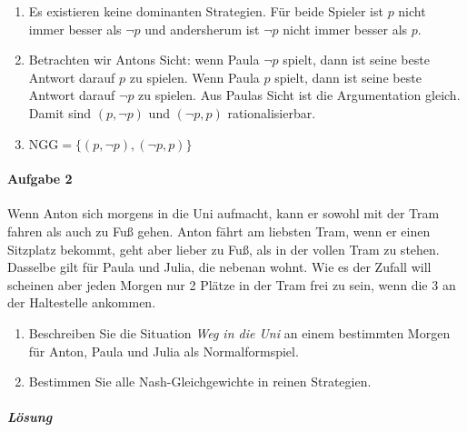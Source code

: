\begin{enumerate}
  \item Es existieren keine dominanten Strategien.
    Für beide Spieler ist $p$ nicht immer besser als $\neg p$
    und andersherum ist $\neg p$ nicht immer besser als $p$.

  \item Betrachten wir Antons Sicht: wenn Paula $\neg p$ spielt,
    dann ist seine beste Antwort darauf $p$ zu spielen.
    Wenn Paula $p$ spielt, dann ist seine beste Antwort darauf $\neg p$ zu spielen.
    Aus Paulas Sicht ist die Argumentation gleich.
    Damit sind $(p, \neg p)$ und $(\neg p, p)$ rationalisierbar.

  \item $\text{NGG} = \{(p, \neg p), (\neg p, p)\}$
\end{enumerate}

\paragraph{Aufgabe 2}%
\label{par:serie_2_aufgabe_2}

Wenn Anton sich morgens in die Uni aufmacht, kann er sowohl mit der Tram fahren als auch
zu Fuß gehen.
Anton fährt am liebsten Tram, wenn er einen Sitzplatz bekommt, geht aber lieber zu Fuß,
als in der vollen Tram zu stehen.
Dasselbe gilt für Paula und Julia, die nebenan wohnt.
Wie es der Zufall will scheinen aber jeden Morgen nur 2 Plätze in der Tram frei zu sein,
wenn die 3 an der Haltestelle ankommen.

\begin{enumerate}
  \item Beschreiben Sie die Situation \textit{Weg in die Uni} an einem bestimmten Morgen
    für Anton, Paula und Julia als Normalformspiel.

  \item Bestimmen Sie alle Nash-Gleichgewichte in reinen Strategien.
\end{enumerate}

\subparagraph{Lösung}%

